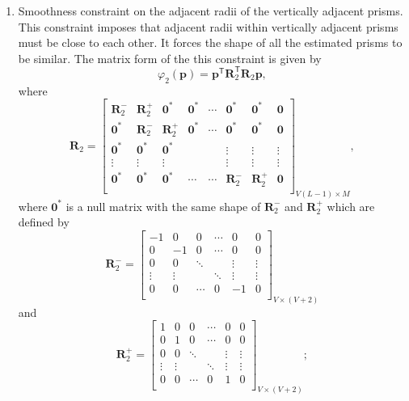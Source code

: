 \documentclass[extra,mreferee]{gji}
\begin{document}
\begin{enumerate}
\item Smoothness constraint on the adjacent radii of the vertically adjacent prisms. This constraint imposes that adjacent radii within vertically adjacent prisms must be close to each other. It forces the shape of all the estimated prisms to be similar. The matrix form of the this constraint is given by
\begin{equation}
\varphi_{2}(\mathbf{p}) = \mathbf{p}^\mathsf{T}\mathbf{R}^\mathsf{T}_{2}\mathbf{R}_{2}\mathbf{p} ,
\end{equation}
where
\begin{equation}
\mathbf{R}_{2} = 
\begin{bmatrix}
\mathbf{R}^{-}_{2} & \mathbf{R}^{+}_{2} & \mathbf{0}^{*} & \mathbf{0}^{*} & \cdots & \mathbf{0}^{*} & \mathbf{0}^{*} & \mathbf{0}\\
\mathbf{0}^{*} & \mathbf{R}^{-}_{2} & \mathbf{R}^{+}_{2} & \mathbf{0}^{*} & \cdots & \mathbf{0}^{*} & \mathbf{0}^{*} & \mathbf{0}\\
\mathbf{0}^{*} & \mathbf{0}^{*} & \mathbf{0}^{*} &  &  & \vdots & \vdots & \vdots\\
\vdots & \vdots & \vdots &  &  & \vdots & \vdots & \vdots\\
\mathbf{0}^{*} & \mathbf{0}^{*} & \mathbf{0}^{*} & \cdots & \cdots & \mathbf{R}^{-}_{2} & \mathbf{R}^{+}_{2} & \mathbf{0}\\
\end{bmatrix}_{V(L-1)\times M},
\end{equation}
where $\mathbf{0}^{*}$ is a null matrix with the same shape of $\mathbf{R}^{-}_2$ and $\mathbf{R}^{+}_2$ which are defined by 
\begin{equation}
\mathbf{R}^{-}_{2} = 
\begin{bmatrix}
-1 & 0 & 0 & \cdots & 0 & 0 \\
0 & -1 & 0 & \cdots & 0 & 0 \\
0 & 0 & \ddots &  & \vdots & \vdots \\
\vdots & \vdots  &  & \ddots & \vdots & \vdots\\
0 & 0 & \cdots & 0 & -1 & 0 \\
\end{bmatrix}_{V\times (V+2)}
\end{equation}
and
\begin{equation}
\mathbf{R}^{+}_{2} = 
\begin{bmatrix}
1 & 0 & 0 & \cdots & 0 & 0 \\
0 & 1 & 0 & \cdots & 0 & 0 \\
0 & 0 & \ddots &  & \vdots & \vdots \\
\vdots & \vdots  &  & \ddots & \vdots & \vdots\\
0 & 0 & \cdots & 0 & 1 & 0 \\
\end{bmatrix}_{V\times (V+2)};
\end{equation}


\end{enumerate}
\end{document}
